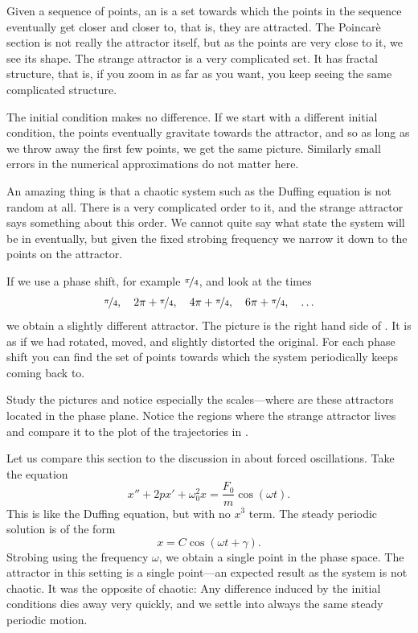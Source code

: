 Given a sequence of points, 
an \emph{} is a set towards which the points
in the sequence
eventually get closer and closer to, that is, they are attracted.  The
Poincar\`e section is not really the attractor itself, but as
the points are very close to it, we see its shape.  The strange
attractor is a very complicated set.   It has
fractal structure, that is, if you zoom in as far as you want, you
keep seeing the same complicated structure.

The initial condition makes no difference.  If
we start with a different initial condition, the points eventually
gravitate towards the attractor, and so as long as we throw away the first
few points, we get the same picture.
Similarly small errors in the numerical approximations do not matter here.

An amazing thing is that a chaotic system such as the Duffing equation is
not random at all.  There is a very complicated order to it, and the strange
attractor says something about this order.  We cannot quite say what state
the system will be in eventually, but given the fixed strobing frequency we
narrow it down to the points on the attractor.

If we use a phase shift, for example $\nicefrac{\pi}{4}$, and look at the
times
\begin{equation*}
\nicefrac{\pi}{4}, \quad
2\pi+\nicefrac{\pi}{4}, \quad
4\pi+\nicefrac{\pi}{4}, \quad
6\pi+\nicefrac{\pi}{4}, \quad
\ldots
\end{equation*}
we obtain a slightly different attractor.
The picture is the right hand side of 
.
It is as if we had
rotated, moved, and slightly distorted the original.
For each phase shift you can find the
set of points towards which the system periodically keeps coming back to.

Study the pictures and notice especially the scales---where are
these attractors located in the phase plane.  Notice the
regions where the strange attractor lives and compare it to the plot of the
trajectories in .

Let us
compare this section to the discussion in  about forced
oscillations.  Take the equation
\begin{equation*}
x''+2p x' + \omega_0^2 x = \frac{F_0}{m} \cos (\omega t) .
\end{equation*}
This is like the Duffing equation, but with no $x^3$ term.
The steady periodic solution is of the form
\begin{equation*}
x = C \cos (\omega t + \gamma) .
\end{equation*}
Strobing using the frequency $\omega$, we obtain a single point in the
phase space.  The attractor in this setting is a single point---an
expected result as the system is not chaotic.  It was the opposite
of chaotic:  Any difference induced by the initial conditions dies away very
quickly, and we settle into always the same steady periodic motion.

